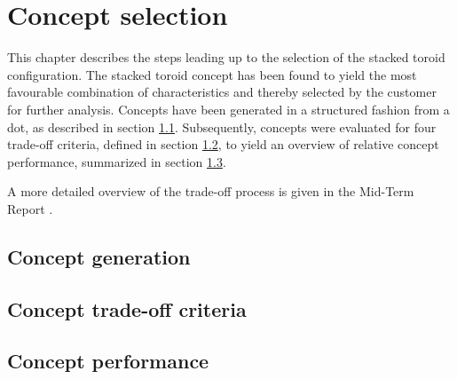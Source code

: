 \section{Concept selection}\label{cha:conceptselection}
This chapter describes the steps leading up to the selection of the stacked toroid configuration. The stacked toroid concept has been found to yield the most favourable combination of characteristics and thereby selected by the customer for further analysis. Concepts have been generated in a structured fashion from a \gls{dot}, as described in section \ref{sec:conceptgen}. Subsequently, concepts were evaluated for four trade-off criteria, defined in section \ref{sec:conceptcriteria}, to yield an overview of relative concept performance, summarized in section \ref{sec:conceptperf}. 

A more detailed overview of the trade-off process is given in the Mid-Term Report \cite{Balasooriyan2015b}.

\subsection{Concept generation} \label{sec:conceptgen}


\subsection{Concept trade-off criteria} \label{sec:conceptcriteria}


\subsection{Concept performance} \label{sec:conceptperf}



